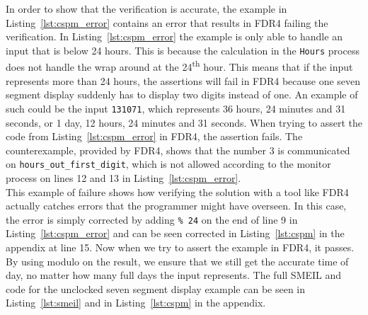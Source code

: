 In order to show that the verification is accurate, the example in Listing~\ref{lst:cspm_error} contains an error that results in FDR4 failing the verification. In Listing~\ref{lst:cspm_error} the example is only able to handle an input that is below 24 hours. This is because the calculation in the \texttt{Hours} process does not handle the wrap around at the 24\textsuperscript{th} hour. This means that if the input represents more than 24 hours, the assertions will fail in FDR4 because one seven segment display suddenly has to display two digits instead of one. An example of such could be the input \texttt{131071}, which represents 36 hours, 24 minutes and 31 seconds, or 1 day, 12 hours, 24 minutes and 31 seconds. When trying to assert the code from Listing~\ref{lst:cspm_error} in FDR4, the assertion fails. The counterexample, provided by FDR4, shows that the number 3 is communicated on \texttt{hours\_out\_first\_digit}, which is not allowed according to the monitor process on lines 12 and 13 in Listing~\ref{lst:cspm_error}.\\

This example of failure shows how verifying the solution with a tool like FDR4 actually catches errors that the programmer might have overseen. In this case, the error is simply corrected by adding \texttt{\% 24} on the end of line 9 in Listing~\ref{lst:cspm_error} and can be seen corrected in Listing~\ref{lst:cspm} in the appendix at line 15. Now when we try to assert the example in FDR4, it passes. By using modulo on the result, we ensure that we still get the accurate time of day, no matter how many full days the input represents.
The full SMEIL and \cspm{} code for the unclocked seven segment display example can be seen in Listing~\ref{lst:smeil} and in Listing~\ref{lst:cspm} in the appendix.

